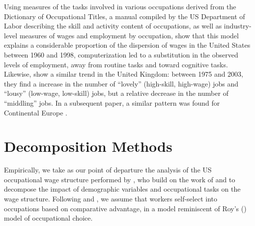Using measures of the tasks involved in various occupations derived from the Dictionary of Occupational Titles, a manual compiled by the US Department of Labor describing the skill and activity content of occupations, as well as industry-level measures of wages and employment by occupation, \citet{Levy2003} show that this model explains a considerable proportion of the dispersion of wages in the United States between 1960 and 1998, computerization led to a substitution in the observed levels of employment, away from routine tasks and toward cognitive tasks. Likewise, \citet{Goos2007} show a similar trend in the United Kingdom: between 1975 and 2003, they find a increase in the number of ``lovely'' (high-skill, high-wage) jobs and ``lousy'' (low-wage, low-skill) jobs, but a relative decrease in the number of ``middling'' jobs. In a subsequent paper, a similar pattern was found for Continental Europe \citep{Goos2009}.


\section{Decomposition Methods}

Empirically, we take as our point of departure the analysis of the US occupational wage structure performed by \citet{Fortin2011}, who build on the work of \citet{Oaxaca1973} and \citet{Juhn1993} to decompose the impact of demographic variables and occupational tasks on the wage structure. Following \citet{Autor2012} and \citet{Fortin2011}, we assume that workers self-select into occupations based on comparative advantage, in a model reminiscent of Roy's (\citeyear{Roy1951}) model of occupational choice.

